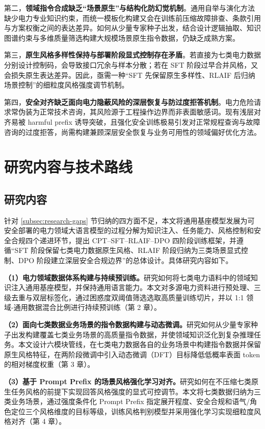 \documentclass[fontset=fandol,type=master,campus=shenzhen,etitleauto=true]{hithesisbook}
\begin{document}
第二，\textbf{领域指令合成缺乏“场景原生”与结构化防幻觉机制}。通用自举与演化方法缺少电力专业知识约束，而统一模板化构建又会在训练前压缩故障排查、条款引用与方案权衡之间的表达差异。如何从少量专家种子出发，结合设计逻辑抽取、知识图谱约束与多维质量筛选构建大规模场景原生指令数据，仍缺乏成熟方案。

第三，\textbf{原生风格多样性保持与部署阶段显式控制存在矛盾}。若直接为七类电力数据分别设计控制码，会导致接口冗余与样本分散；若在 SFT 阶段过早合并风格，又会损失原生表达差异。因此，亟需一种“SFT 先保留原生多样性、RLAIF 后归纳场景控制”的细粒度风格强度调节机制。

第四，\textbf{安全对齐缺乏面向电力隐蔽风险的深层恢复与防过度拒答机制}。电力危险请求常伪装为正常技术咨询，其风险源于工程操作边界而非表面敏感词。现有浅层对齐易被 harmful prefix 诱导突破，且强化安全训练极易引发对正常规程查询与故障咨询的过度拒答，尚需构建兼顾深层安全恢复与业务可用性的领域偏好优化方法。


\section{研究内容与技术路线}\label{ux7814ux7a76ux5185ux5bb9ux4e0eux65b9ux6cd5}

\subsection{研究内容}

针对 \ref{subsec:research-gaps} 节归纳的四方面不足，本文将通用基座模型发展为可安全部署的电力领域大语言模型的过程分解为知识注入、任务能力、风格控制和安全合规四个递进环节，提出 CPT--SFT--RLAIF--DPO 四阶段训练框架，并遵循“SFT 阶段保留七类电力数据原生风格、RLAIF 阶段归纳为三类场景显式控制、DPO 阶段建立深层安全合规边界”的总体设计。具体研究内容如下。

\textbf{（1）电力领域数据体系构建与持续预训练。}研究如何将七类电力语料中的领域知识注入通用基座模型，并保持通用语言能力。本文对多源电力资料进行预处理、三级去重与双层标签化，通过困惑度双阈值筛选选取高质量训练切片，并以 1:1 领域-通用数据混合比例进行持续预训练（第 2 章）。

\textbf{（2）面向七类数据业务场景的指令数据构建与动态微调。}研究如何从少量专家种子出发构建覆盖七类业务场景的高质量指令数据，并使领域知识泛化到复杂推理任务。本文设计六模块管线，在七类电力数据各自的业务场景中构建指令数据并保留原生风格特征，在两阶段微调中引入动态微调（DFT）目标降低低概率表面 token 的相对梯度权重（第 3 章）。

\textbf{（3）基于 Prompt Prefix 的场景风格强化学习对齐。}研究如何在不压缩七类原生任务风格的前提下实现回答风格强度的显式可控调节。本文将七类数据归纳为三类业务场景，通过强度条件化 Prompt Prefix 指定展开程度、安全合规和语气/角色定位三个风格维度的目标等级，训练风格判别模型并采用强化学习实现细粒度风格对齐（第 4 章）。
\end{document}
